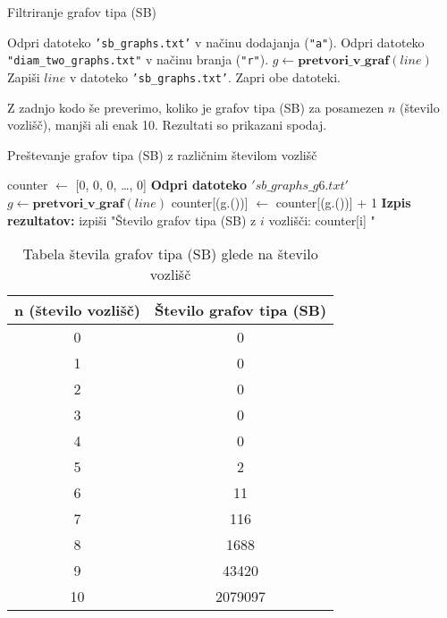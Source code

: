 \documentclass{article}
\begin{document}
\begin{algorithm}
    \caption{Filtriranje grafov tipa (SB)}
    \begin{algorithmic}[1]
    \State Odpri datoteko \texttt{'sb\_graphs.txt'} v načinu dodajanja (\texttt{"a"}).
    \State Odpri datoteko \texttt{"diam\_two\_graphs.txt"} v načinu branja (\texttt{"r"}).
        \State $g \gets \textbf{pretvori\_v\_graf}(line)$ 
         
            \State Zapiši $line$ v datoteko \texttt{'sb\_graphs.txt'}.
        \EndIf
    \EndFor
    \State Zapri obe datoteki.
    \end{algorithmic}
\end{algorithm}

Z zadnjo kodo še preverimo, koliko je grafov tipa (SB) za posamezen $n$ (število vozlišč), manjši ali enak 10.
Rezultati so prikazani spodaj.



\begin{algorithm}
    \caption{Preštevanje grafov tipa (SB) z različnim številom vozlišč}
    \begin{algorithmic}[1]
    \State counter $\gets$ [0, 0, 0, \dots, 0] 
    \State \textbf{Odpri datoteko $'sb\_graphs\_g6.txt'$}
        \State $g \gets \textbf{pretvori\_v\_graf}(line)$ 
        \State counter[(g.())] $\gets$ counter[(g.())] + 1
    \EndFor
    \State \textbf{Izpis rezultatov:}
        \State izpiši "Število grafov tipa (SB) z $i$ vozlišči: counter[i] "
    \EndFor
    \end{algorithmic}
 \end{algorithm}

 \begin{table}[h!]
    \centering
    \begin{tabular}{|c|c|}
    \hline
    \textbf{n (število vozlišč)} & \textbf{Število grafov tipa (SB)} \\
    \hline
    0 & 0 \\
    1 & 0 \\
    2 & 0 \\
    3 & 0 \\
    4 & 0 \\
    5 & 2 \\
    6 & 11 \\
    7 & 116\\
    8 & 1688\\
    9 & 43420 \\
    10 & 2079097 \\
    \hline
    \end{tabular}
    \caption{Tabela števila grafov tipa (SB) glede na število vozlišč}
    \end{table}
\end{document}
